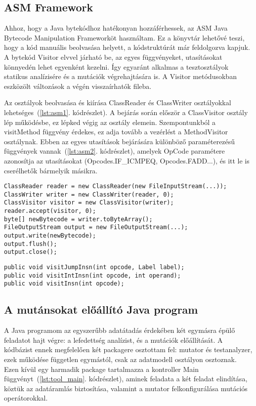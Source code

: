 \subsection{ASM Framework}
Ahhoz, hogy a Java bytekódhoz hatékonyan hozzáférhessek, az ASM Java Bytecode Manipulation Frameworköt használtam. Ez a könyvtár lehetővé teszi, hogy a kód manuális beolvasása helyett, a kódstruktúrát már feldolgozva kapjuk. A bytekód Visitor elvvel járható be, az egyes függvényeket, utasításokat könnyedén lehet egyenként kezelni. Így egyaránt alkalmas a tesztosztályok statikus analízisére és a mutációk végrehajtására is. A Visitor metódusokban eszközölt változások a végén visszaírhatók fileba.

Az osztályok beolvasása és kiírása ClassReader és ClassWriter osztályokkal lehetséges~(\ref{lst:asm1}. kódrészlet). A bejárás során először a ClassVisitor osztály lép működésbe, ez lépked végig az osztály elemein. Szempontunkból a visitMethod függvény érdekes, ez adja tovább a vezérlést a MethodVisitor osztálynak. Ebben az egyes utasítások bejárására különböző paraméterezésű függvények vannak~(\ref{lst:asm2}. kódrészlet), amelyek OpCode paramétere azonosítja az utasításokat (Opcodes.IF\_ICMPEQ, Opcodes.FADD...), és itt le is cserélhetők bármelyik másikra. 


\begin{lstlisting}[frame=single,float=!ht,caption={Java bytekód beolvasása, feldolgozása, kiíratása ASM segítségével},captionpos=b,label={lst:asm1}]
ClassReader reader = new ClassReader(new FileInputStream(...));
ClassWriter writer = new ClassWriter(reader, 0);
ClassVisitor visitor = new ClassVisitor(writer);
reader.accept(visitor, 0);
byte[] newBytecode = writer.toByteArray();
FileOutputStream output = new FileOutputStream(...);
output.write(newBytecode);
output.flush();
output.close();
\end{lstlisting}

\begin{lstlisting}[frame=single,float=!ht,caption={A MethodVisitor általam használt bejáró függvényeinek fejlécei},captionpos=b,label={lst:asm2}]
public void visitJumpInsn(int opcode, Label label);
public void visitIntInsn(int opcode, int operand);
public void visitInsn(int opcode);
\end{lstlisting}

\subsection{A mutánsokat előállító Java program}
A Java programom az egyszerűbb adatátadás érdekében két egymásra épülő feladatot hajt végre: a lefedettség analízist, és a mutációk előállítását. A kódbázist ennek megfelelően két packagere osztottam fel: mutator és testanalyzer, ezek működése független egymástól, csak az adatmodell osztályon osztoznak. Ezen kívül egy harmadik package tartalmazza a kontroller Main függvényt~(\ref{lst:tool_main}. kódrészlet), aminek feladata a két feladat elindítása, köztük az adatáramlás biztosítása, valamint a mutator felkonfigurálása mutációs operátorokkal.

